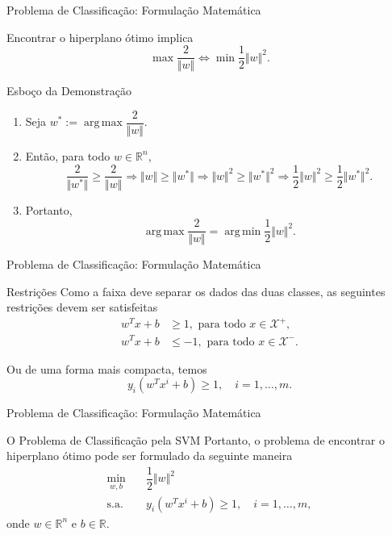 \documentclass{beamer}
\DeclareMathOperator*{\argmax}{arg\, max}
\DeclareMathOperator*{\argmin}{arg\, min}
\def\Xset{\mathcal{X}}
\def\RR{\mathds{R}}
\theoremstyle{definition}%
\begin{document}
\begin{frame}{Problema de Classificação: Formulação Matemática}
\begin{block}{}
Encontrar o hiperplano ótimo implica 
\[ \max \dfrac{2}{\Vert w\Vert}  \Longleftrightarrow \min \dfrac{1}{2}\Vert w\Vert^{2}. \]
\end{block}
\pause
\begin{exampleblock}{Esboço da Demonstração}
\begin{enumerate}

	\item Seja $w^{*}:=\argmax\dfrac{2}{\Vert w\Vert}$. 

	\item Então, para todo $w\in \RR^n$,
\[ \dfrac{2}{\Vert w^{*}\Vert} \geq \dfrac{2}{\Vert w\Vert} \Rightarrow \Vert w\Vert \geq \Vert w^{*}\Vert \Rightarrow \Vert w\Vert^{2} \geq \Vert w^{*}\Vert^{2} \Rightarrow \dfrac{1}{2}\Vert w\Vert^{2} \geq \dfrac{1}{2}\Vert w^{*}\Vert^{2}. \]

	\item Portanto,
\[ \argmax\dfrac{2}{\Vert w\Vert} = \argmin\dfrac{1}{2}\Vert w\Vert^2. \]
\end{enumerate}
\end{exampleblock}
\end{frame}


\begin{frame}{Problema de Classificação: Formulação Matemática}
\begin{block}{Restrições}
Como a faixa deve separar os dados das duas classes, as seguintes restrições devem ser satisfeitas
\begin{align}
w^{T}x+b &\geq 1 , \text{ para  todo } x\in \Xset^{+}, \\
w^{T}x+b &\leq -1 , \text{ para  todo } x\in \Xset^{-}.
\end{align}

Ou de uma forma mais compacta, temos
\[ y_{i}(w^{T}x^{i}+b)\geq 1, \quad i=1, \ldots ,m. \]
\end{block}
\end{frame}


\begin{frame}{Problema de Classificação: Formulação Matemática}
\begin{block}{O Problema de Classificação pela SVM}
Portanto, o problema de encontrar o hiperplano ótimo pode ser formulado da seguinte maneira
\[ \label{eq5}
\begin{aligned}
\min_{w,b} & \quad \dfrac{1}{2} \Vert w\Vert^{2} \\
\text{s.a.} &  \quad y_i(w^{T}x^{i}+b) \geq 1, \quad i=1, \ldots , m, \end{aligned}
\]
onde $w\in \RR^{n}$ e $b\in \RR$. 
\end{block}
\end{frame}
\end{document}

